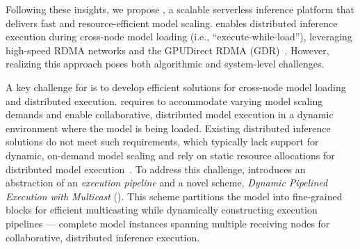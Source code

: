 Following these insights, we propose \SysName, a scalable serverless inference platform that delivers fast and resource-efficient model scaling. 
\SysName enables distributed inference execution during cross-node model loading (i.e., ``execute-while-load''), leveraging high-speed RDMA networks and the GPUDirect RDMA (GDR)~\cite{gdr}.
However, realizing this approach poses both algorithmic and system-level challenges.

A key challenge for \SysName is to develop efficient solutions for cross-node model loading and distributed execution.
\SysName requires to accommodate varying model scaling demands and enable collaborative, distributed model execution in a dynamic environment where the model is being loaded.
Existing distributed inference solutions do not meet such requirements, which typically lack support for dynamic, on-demand model scaling and rely on static resource allocations for distributed model execution~\cite{li_alpaserve_2023,zhang_shepherd_nodate,yang_infless_2022}.
To address this challenge, \SysName introduces an abstraction of an \emph{execution pipeline} and a novel scheme, \emph{Dynamic Pipelined Execution with Multicast} (\AlgoName).
This scheme partitions the model into fine-grained blocks for efficient multicasting while dynamically constructing execution pipelines --- complete model instances spanning multiple receiving nodes for collaborative, distributed inference execution.


